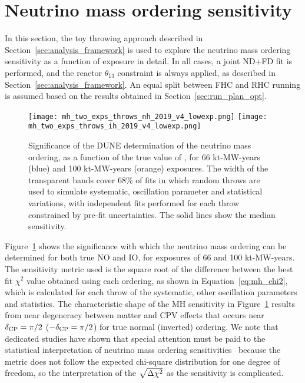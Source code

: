 \section{Neutrino mass ordering sensitivity}
\label{sec:mh_sens}

In this section, the toy throwing approach described in Section~\ref{sec:analysis_framework} is used to explore the neutrino mass ordering sensitivity as a function of exposure in detail. In all cases, a joint ND+FD fit is performed, and the reactor $\theta_{13}$ constraint is always applied, as described in Section~\ref{sec:analysis_framework}. An equal split between FHC and RHC running is assumed based on the results obtained in Section~\ref{sec:run_plan_opt}.

\begin{figure}[htbp]
  \centering
  \texttt{[image: mh\_two\_exps\_throws\_nh\_2019\_v4\_lowexp.png]}
  \texttt{[image: mh\_two\_exps\_throws\_ih\_2019\_v4\_lowexp.png]}
  \caption{Significance of the DUNE determination of the neutrino mass ordering, as a function of the true value of \deltacp, for 66 kt-MW-years (blue) and 100 kt-MW-years (orange) exposures. The width of the transparent bands cover 68\% of fits in which random throws are used to simulate systematic, oscillation parameter and statistical variations, with independent fits performed for each throw constrained by pre-fit uncertainties. The solid lines show the median sensitivity.}
  \label{fig:mh_bands}
\end{figure}
Figure~\ref{fig:mh_bands} shows the significance with which the neutrino mass ordering can be determined for both true NO and IO, for exposures of 66 and 100 kt-MW-years. The sensitivity metric used is the square root of the difference between the best fit $\chi^{2}$ value obtained using each ordering, as shown in Equation~\ref{eq:mh_chi2}, which is calculated for each throw of the systematic, other oscillation parameters and statistics. The characteristic shape of the MH sensitivity in Figure~\ref{fig:mh_bands} results from near degeneracy between matter and CPV effects that occurs near $\delta_{\rm CP}=\pi/2$ ($-\delta_{\rm CP}=\pi/2$) for true normal (inverted) ordering. We note that dedicated studies have shown that special attention must be paid to the statistical interpretation of neutrino mass ordering sensitivities~\cite{Ciuffoli:2013rza,Qian:2012zn,Blennow:2013oma} because the \dchisq metric does not follow the expected chi-square distribution for one degree of freedom, so the interpretation of the $\sqrt{\Delta\chi^{2}}$ as the sensitivity is complicated.

